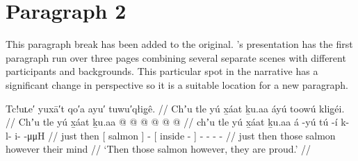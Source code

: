 \section{Paragraph 2}\label{sec:099-para-2}

This paragraph break has been added to the original.
\citeauthor{swanton:1909}’s presentation has the first paragraph run over three pages combining several separate scenes with different participants and backgrounds.
This particular spot in the narrative has a significant change in perspective so it is a suitable location for a new paragraph.

\ex\label{ex:099-25-salmon-proud}%
%
\begingl
	\glpreamble	Tc!uʟe′ yuxā′t qo′a ayu′ tuwu′qłig̣ê. //
	\glpreamble	Chʼu tle yú x̱áat ḵu.aa áyú toowú klig̱éi. //
	\gla	Chʼu tle {} yú x̱áat {} ḵu.aa  @ {}
		{} {}  @ {} {}  @ {} @ {} @ {} @ {} //
	\glb	chʼu tle {} yú x̱áat {} ḵu.aa á -yú
		{} {} tú -í {} k- l- i-  -μμH //
	\glc	just then {}[  salmon {}]   -
		{}[  inside - {}] - - -  - //
	\gld	just then {} those salmon {} however  {}
		{} their mind {} {}  {} {} {} {} //
	\glft	‘Then those salmon however, they are proud.’
		//
\endgl
\xe
